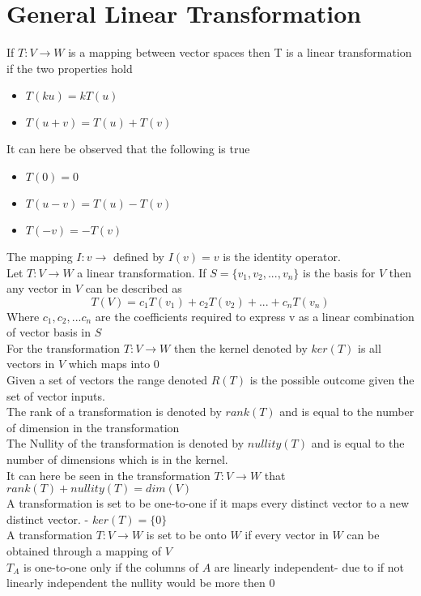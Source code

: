 \documentclass[12pt, a4paper]{article}
\begin{document}
	\section{General Linear Transformation}
		If $T:V\rightarrow W$ is a mapping between vector spaces then T is a linear transformation if the two properties hold
		\begin{itemize}
			\item $T(ku)=kT(u)$
			\item $T(u+v)=T(u)+T(v)$
		\end{itemize}
		It can here be observed that the following is true
		\begin{itemize}
			\item $T(0)=0$
			\item $T(u-v)=T(u)-T(v)$
			\item $T(-v)=-T(v)$
		\end{itemize}
		The mapping $I:v\rightarrow$ defined by $I(v)=v$ is the identity operator.\\
		Let $T:V\rightarrow W$ a linear transformation. If $S=\{v_1,v_2,...,v_n\}$ is the basis for $V$ then any vector in $V$ can be described as
		$$T(V)=c_1T(v_1)+c_2T(v_2)+...+c_nT(v_n)$$
		Where $c_1,c_2,...c_n$ are the coefficients required to express v as a linear combination of vector basis in $S$\\
		For the transformation $T:V\rightarrow W$ then the kernel denoted by $ker(T)$ is all vectors in $V$ which maps into $0$\\
		Given a set of vectors the range denoted $R(T)$ is the possible outcome given the set of vector inputs.\\
		The rank of a transformation is denoted by $rank(T)$ and is equal to the number of dimension in the transformation\\
		The Nullity of the transformation is denoted by $nullity(T)$ and is equal to the number of dimensions which is in the kernel.\\
		It can here be seen in the transformation $T:V\rightarrow W$ that $rank(T)+nullity(T)=dim(V)$\\
		A transformation is set to be one-to-one if it maps every distinct vector to a new distinct vector. - $ker(T)=\{0\}$\\
		A transformation $T: V\rightarrow W$ is set to be onto $W$ if every vector in $W$ can be obtained through a mapping of $V$\\
		$T_A$ is one-to-one only if the columns of $A$ are linearly independent- due to if not linearly independent the nullity would be more then 0\\[4mm]
\end{document}
